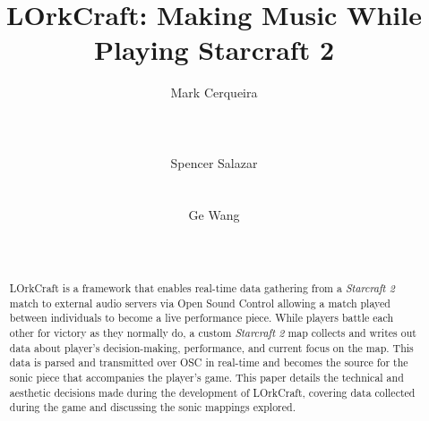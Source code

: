 \documentclass{nime-document-class}
\begin{document}

\newcommand{\projectName}{LOrkCraft}

\title{\projectName{}: Making Music While Playing Starcraft 2}

\author{
\alignauthor
Mark Cerqueira\\
       \\
       \\
       \\
\alignauthor
Spencer Salazar\\
       \\
       \\
\alignauthor
Ge Wang\\
       \\
       \\
}

\maketitle
\begin{abstract}
\projectName{} is a framework that enables real-time data gathering from a {\em Starcraft 2} match to external audio servers via Open Sound Control allowing a match played between individuals to become a live performance piece.
While players battle each other for victory as they normally do, a custom {\em Starcraft 2} map collects and writes out data about player's decision-making, performance, and current focus on the map.
This data is parsed and transmitted over OSC in real-time and becomes the source for the sonic piece that accompanies the player's game.
This paper details the technical and aesthetic decisions made during the development of \projectName{}, covering data collected during the game and discussing the sonic mappings explored.
\end{abstract}

\end{document}
